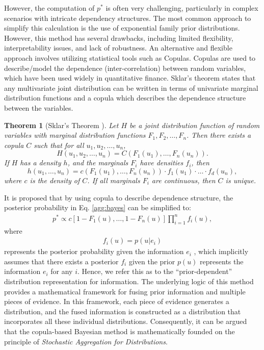 \documentclass[letterpaper]{article} %
\newtheorem{theorem}{Theorem}
\theoremstyle{definition}
\theoremstyle{remark}
\begin{document}
However, the computation of $p^*$ is often very challenging, particularly in complex scenarios with intricate dependency structures. The most common approach to simplify this calculation is the use of exponential family prior distributions. However, this method has several drawbacks, including limited flexibility, interpretability issues, and lack of robustness. An alternative and flexible approach involves utilizing statistical tools such as Copulas.
Copulas are used to describe/model the dependence (inter-correlation) between random variables, which have been used widely in quantitative finance. Sklar's theorem states that any multivariate joint distribution can be written in terms of univariate marginal distribution functions and a copula which describes the dependence structure between the variables.
\begin{theorem}[Sklar's Theorem \cite{renyi1959measures}]
    Let \( H \) be a joint distribution function of random variables with marginal distribution functions \( F_1, F_2, \ldots, F_n \). Then there exists a copula \( C \) such that for all \( u_1, u_2, \ldots, u_n \),
    \begin{equation*}
        H(u_1, u_2, \ldots, u_n) = C(F_1(u_1), \ldots, F_n(u_n)).
    \end{equation*}
    If \( H \) has a density \( h \), and the marginals \( F_i \) have densities \( f_i \), then 
    \begin{equation*}
        h(u_1, \ldots, u_n) = c(F_1(u_1), \ldots, F_n(u_n)) \cdot f_1(u_1)  \cdot \ldots \cdot f_d(u_n),
    \end{equation*}
    where \( c \) is the density of \( C \). If all marginals \( F_i \) are continuous, then \( C \) is unique.
\end{theorem}
It is proposed that by using copula to describe dependence structure, the posterior probability in Eq. \eqref{agg:bayes} can be simplified to:
\begin{align}
\label{agg:bayes_c}
   p^* \propto c[1-F_1(u), \ldots, 1-F_n(u)] \prod_{i=1}^{n} f_i(u),  
\end{align}
where 
\begin{align}
\label{asp:one_info}
    f_i(u) = p(u | e_i)
\end{align}
represents the posterior probability given the information \( e_i \) \cite{jouini1996copula}, which implicitly assumes that there exists a posterior $f_i$ given the prior $p(u)$ represents the information $e_i$ for any $i$. Hence, we refer this as to the ``prior-dependent'' distribution representation for information. The underlying logic of this method provides a mathematical framework for fusing prior information and multiple pieces of evidence. In this framework, each piece of evidence generates a distribution, and the fused information is constructed as a distribution that incorporates all these individual distributions. Consequently, it can be argued that the copula-based Bayesian method is mathematically founded on the principle of \emph{Stochastic Aggregation for Distributions}. 
\end{document}
